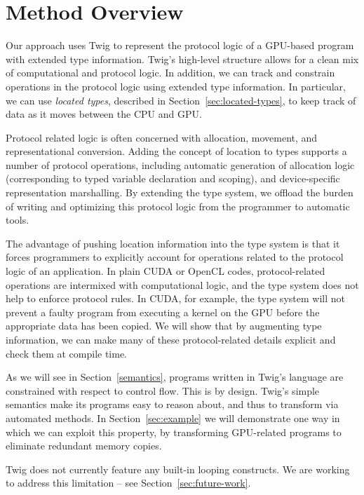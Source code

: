 
\section{Method Overview}

Our approach uses Twig to represent the protocol logic of a GPU-based program with extended type information. Twig's high-level structure allows for a clean mix of computational and protocol logic. In addition, we can track and constrain operations in the protocol logic using extended type information. In particular, we can use \emph{located types}, described in Section~\ref{sec:located-types}, to keep track of data as it moves between the CPU and GPU.

Protocol related logic is often concerned with allocation, movement, and representational conversion. Adding the concept of location to types supports a number of protocol operations, including automatic generation of allocation logic (corresponding to typed variable declaration and scoping), and device-specific representation marshalling. By extending the type system, we offload the burden of writing and optimizing this protocol logic from the programmer to automatic tools.

The advantage of pushing location information into the type system is that it forces programmers to explicitly account for operations related to the protocol logic of an application. In plain CUDA or OpenCL codes, protocol-related operations are intermixed with computational logic, and the type system does not help to enforce protocol rules. In CUDA, for example, the type system will not prevent a faulty program from executing a kernel on the GPU before the appropriate data has been copied. We will show that by augmenting type information, we can make many of these protocol-related details explicit and check them at compile time.

As we will see in Section~\ref{semantics}, programs written in Twig's language are constrained with respect to control flow. This is by design. Twig's simple semantics make its programs easy to reason about, and thus to transform via automated methods. In Section~\ref{sec:example} we will demonstrate one way in which we can exploit this property, by transforming GPU-related programs to eliminate redundant memory copies. 

Twig does not currently feature any built-in looping constructs. We are working to address this limitation -- see Section~\ref{sec:future-work}.

